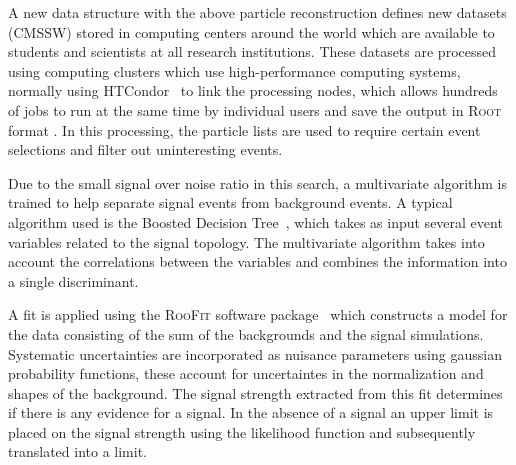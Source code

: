 \documentclass[final,3p]{CSP}
\begin{document}
A new data structure with the above particle reconstruction defines new  datasets (\textsc{CMSSW}) stored in computing centers around the world which are available to students and scientists at all research institutions.
These  datasets are processed using computing clusters which use high-performance computing systems, normally using HTCondor~\cite{HTCondor} to link the processing nodes, which allows hundreds of jobs to run at the same time by individual users and save the output in \textsc{Root} format \cite{brun2003root}.
In this processing, the particle lists are used to require certain event selections and filter out uninteresting events.

Due to the small signal over noise ratio in this search, a multivariate algorithm is trained to help separate signal events from background events. A typical algorithm used is the Boosted Decision Tree~\cite{hoecker2007tmva}, which takes as input several event variables related to the signal topology. The multivariate algorithm takes into account the correlations between the variables and combines the information into a single discriminant. 

A fit is applied using the \textsc{RooFit} software package~\cite{verkerke2008roofit} which constructs a model for the data consisting of the sum of the backgrounds and the signal simulations. Systematic uncertainties are incorporated as nuisance parameters using gaussian probability functions, these account for uncertaintes in the normalization and shapes of the background.
The signal strength extracted from this fit determines if there is any evidence for a signal. In the absence of a signal an upper limit is placed on the signal strength using the likelihood function and subsequently translated into a limit.
\end{document}
